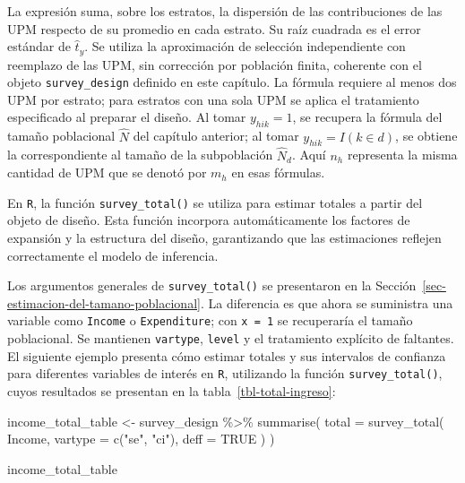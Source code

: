 \documentclass[
  spanish,
  11pt,
  letterpaper,
  oneside,
  open=any]{scrbook}
\newenvironment{Shaded}{\begin{snugshade}}{\end{snugshade}}
\newcommand{\AttributeTok}[1]{\textcolor[rgb]{0.40,0.45,0.13}{#1}}
\newcommand{\ConstantTok}[1]{\textcolor[rgb]{0.56,0.35,0.01}{#1}}
\newcommand{\FunctionTok}[1]{\textcolor[rgb]{0.28,0.35,0.67}{#1}}
\newcommand{\NormalTok}[1]{\textcolor[rgb]{0.00,0.23,0.31}{#1}}
\newcommand{\OtherTok}[1]{\textcolor[rgb]{0.00,0.23,0.31}{#1}}
\newcommand{\SpecialCharTok}[1]{\textcolor[rgb]{0.37,0.37,0.37}{#1}}
\newcommand{\StringTok}[1]{\textcolor[rgb]{0.13,0.47,0.30}{#1}}
\begin{document}
La expresión suma, sobre los estratos, la dispersión de las
contribuciones de las UPM respecto de su promedio en cada estrato. Su
raíz cuadrada es el error estándar de \(\hat{t}_y\). Se utiliza la
aproximación de selección independiente con reemplazo de las UPM, sin
corrección por población finita, coherente con el objeto
\texttt{survey\_design} definido en este capítulo. La fórmula requiere
al menos dos UPM por estrato; para estratos con una sola UPM se aplica
el tratamiento especificado al preparar el diseño. Al tomar
\(y_{hik}=1\), se recupera la fórmula del tamaño poblacional \(\hat{N}\)
del capítulo anterior; al tomar \(y_{hik}=I(k\in d)\), se obtiene la
correspondiente al tamaño de la subpoblación \(\hat{N}_d\). Aquí \(n_h\)
representa la misma cantidad de UPM que se denotó por \(m_h\) en esas
fórmulas.

En \texttt{R}, la función \texttt{survey\_total()} se utiliza para
estimar totales a partir del objeto de diseño. Esta función incorpora
automáticamente los factores de expansión y la estructura del diseño,
garantizando que las estimaciones reflejen correctamente el modelo de
inferencia.

Los argumentos generales de \texttt{survey\_total()} se presentaron en
la Sección~\ref{sec-estimacion-del-tamano-poblacional}. La diferencia es
que ahora se suministra una variable como \texttt{Income} o
\texttt{Expenditure}; con \texttt{x\ =\ 1} se recuperaría el tamaño
poblacional. Se mantienen \texttt{vartype}, \texttt{level} y el
tratamiento explícito de faltantes. El siguiente ejemplo presenta cómo
estimar totales y sus intervalos de confianza para diferentes variables
de interés en \texttt{R}, utilizando la función
\texttt{survey\_total()}, cuyos resultados se presentan en la
tabla~\ref{tbl-total-ingreso}:

\begin{Shaded}
\begin{Highlighting}[]
\NormalTok{income\_total\_table }\OtherTok{\textless{}{-}}\NormalTok{ survey\_design }\SpecialCharTok{\%\textgreater{}\%}
  \FunctionTok{summarise}\NormalTok{(}
    \AttributeTok{total =} \FunctionTok{survey\_total}\NormalTok{(}
\NormalTok{      Income,}
      \AttributeTok{vartype =} \FunctionTok{c}\NormalTok{(}\StringTok{"se"}\NormalTok{, }\StringTok{"ci"}\NormalTok{),}
      \AttributeTok{deff =} \ConstantTok{TRUE}
\NormalTok{    )}
\NormalTok{  )}

\NormalTok{income\_total\_table}
\end{Highlighting}
\end{Shaded}
\end{document}
